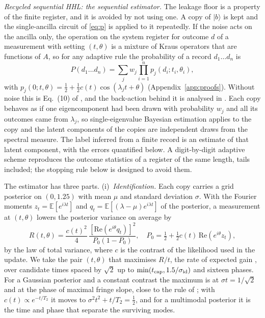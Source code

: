\documentclass[journal]{IEEEtran}
\begin{document}
\emph{Recycled sequential HHL: the sequential estimator.} The leakage floor is a property of the finite register, and it is avoided by not using one. A copy of $|b\rangle$ is kept and the single-ancilla circuit of \eqref{eq:p} is applied to it repeatedly. If the noise acts on the ancilla only, the operation on the system register for outcome $d$ of a measurement with setting $(t,\theta)$ is a mixture of Kraus operators that are functions of $A$, so for any adaptive rule the probability of a record $d_1\dots d_n$ is
\begin{equation}
P(d_1\dots d_n)=\sum_jw_j\prod_{i=1}^np_j(d_i;t_i,\theta_i),
\label{eq:record}
\end{equation}
with $p_j(0;t,\theta)=\tfrac12+\tfrac12c(t)\cos(\lambda_jt+\theta)$ (Appendix~\ref{app:proofs}). Without noise this is Eq.~(10) of \cite{OBrien2019}, and the back-action behind it is analysed in \cite{Jin2023}. Each copy behaves as if one eigencomponent had been drawn with probability $w_j$ and all its outcomes came from $\lambda_j$, so single-eigenvalue Bayesian estimation applies to the copy and the latent components of the copies are independent draws from the spectral measure. The label inferred from a finite record is an estimate of that latent component, with the errors quantified below. A digit-by-digit adaptive scheme \cite{Jin2023} reproduces the outcome statistics of a register of the same length, tails included; the stopping rule below is designed to avoid them.

The estimator has three parts. (i)~\emph{Identification.} Each copy carries a grid posterior on $(0,1.25)$ with mean $\mu$ and standard deviation $\sigma$. With the Fourier moments $z_t=\mathbb E[e^{i\lambda t}]$ and $q_t=\mathbb E[(\lambda-\mu)e^{i\lambda t}]$ of the posterior, a measurement at $(t,\theta)$ lowers the posterior variance on average by
\begin{equation}
R(t,\theta)=\frac{c(t)^2}{4}\,\frac{[\mathrm{Re}(e^{i\theta}q_t)]^2}{P_0(1-P_0)},\quad P_0=\tfrac12+\tfrac12c(t)\,\mathrm{Re}(e^{i\theta}z_t),
\label{eq:design}
\end{equation}
by the law of total variance, where $c$ is the contrast of the likelihood used in the update. We take the pair $(t,\theta)$ that maximises $R/t$, the rate of expected gain \cite{deNeeve2025,McMichael2021}, over candidate times spaced by $\sqrt2$ up to $\min(t_{\rm cap},1.5/\sigma_{\rm id})$ and sixteen phases. For a Gaussian posterior and a constant contrast the maximum is at $\sigma t=1/\sqrt2$ and at the phase of maximal fringe slope, close to the rule of \cite{WiebeGranade2016}; with $c(t)\propto e^{-t/T_2}$ it moves to $\sigma^2t^2+t/T_2=\tfrac12$, and for a multimodal posterior it is the time and phase that separate the surviving modes.
\end{document}
